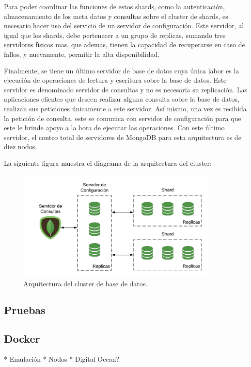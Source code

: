 Para poder coordinar las funciones de estos shards, como la autenticación, almacenamiento de los meta datos y consultas sobre el cluster de shards,
es necesario hacer uso del servicio de un servidor de configuración.
Este servidor, al igual que los shards, debe pertenecer a un grupo de replicas, sumando tres servidores físicos mas, que ademas,
tienen la capacidad de recuperarse en caso de fallos, y nuevamente, permitir la alta disponibilidad.

Finalmente, se tiene un último servidor de base de datos cuya única labor es la ejecución de operaciones de lectura y escritura sobre la base de datos.
Este servidor es denominado servidor de consultas y no es necesaria su replicación.
Las aplicaciones clientes que deseen realizar alguna consulta sobre la base de datos, realizan sus peticiones únicamente a este servidor.
Así mismo, una vez es recibida la petición de consulta, este se comunica con servidor de configuración para que este le brinde apoyo a la hora de ejecutar las operaciones.
Con este último servidor, el conteo total de servidores de MongoDB para esta arquitectura es de diez nodos.

La siguiente figura muestra el diagrama de la arquitectura del cluster:

\begin{figure}[H]
	\centering
		\includegraphics[width=0.9\textwidth]{figures/mongo_cluster}
	\caption{Arquitectura del cluster de base de datos.}
	\label{fig:mongo_cluster}
\end{figure}

\subsection{Pruebas}


\subsection{Docker}

* Emulación
* Nodos
* Digital Ocean?
